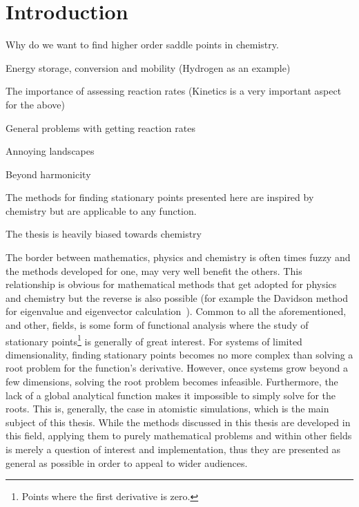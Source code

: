 \chapter{Introduction}
\label{chap:introduction}

\bit
\item Why do we want to find higher order saddle points in chemistry.
\item Energy storage, conversion and mobility (Hydrogen as an example)
\item The importance of assessing reaction rates (Kinetics is a very important aspect for the above)
\item General problems with getting reaction rates
\item Annoying landscapes
\item Beyond harmonicity
\item The methods for finding stationary points presented here are inspired by chemistry but are applicable to any function.
\item The thesis is heavily biased towards chemistry
\eit

The border between mathematics, physics and chemistry is often times fuzzy and the methods developed for one, may very well benefit the others.
This relationship is obvious for mathematical methods that get adopted for physics and chemistry but the reverse is also possible (for example the Davidson method for eigenvalue and eigenvector calculation~\cite{davidson-method-1975}).
Common to all the aforementioned, and other, fields, is some form of functional analysis where the study of stationary points\footnote{Points where the first derivative is zero.} is generally of great interest.
For systems of limited dimensionality, finding stationary points becomes no more complex than solving a root problem for the function's derivative.
However, once systems grow beyond a few dimensions, solving the root problem becomes infeasible.
Furthermore, the lack of a global analytical function  makes it impossible to simply solve for the roots.
This is, generally, the case in atomistic simulations, which is the main subject of this thesis.
While the methods discussed in this thesis are developed in this field, applying them to purely mathematical problems and within other fields is merely a question of interest and implementation, thus they are presented as general as possible in order to appeal to wider audiences.


